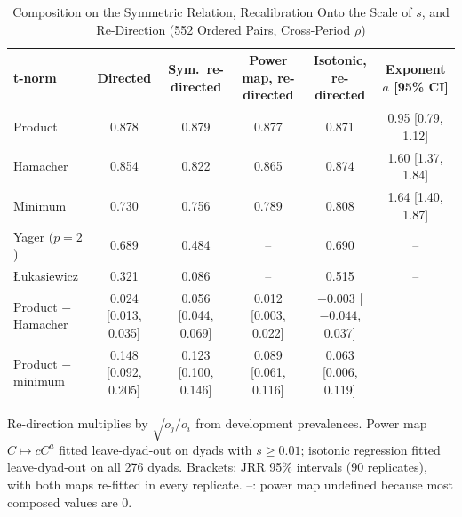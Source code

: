 \documentclass[journal]{IEEEtran}
\begin{document}
\setcounter{table}{16}\begin{table}[!t]
\caption{Composition on the Symmetric Relation, Recalibration Onto the Scale of $s$, and Re-Direction (552 Ordered Pairs, Cross-Period $\rho$)}
\centering
\scriptsize
\setlength{\tabcolsep}{3pt}
\begin{tabular}{@{}l c c c c c@{}}
\toprule
t-norm & Directed & Sym.\ re-directed & Power map, re-directed & Isotonic, re-directed & Exponent $a$ [95\% CI]\\
\midrule
Product & 0.878 & 0.879 & 0.877 & 0.871 & 0.95 [0.79, 1.12]\\
Hamacher & 0.854 & 0.822 & 0.865 & 0.874 & 1.60 [1.37, 1.84]\\
Minimum & 0.730 & 0.756 & 0.789 & 0.808 & 1.64 [1.40, 1.87]\\
Yager ($p=2$) & 0.689 & 0.484 & -- & 0.690 & --\\
{\L}ukasiewicz & 0.321 & 0.086 & -- & 0.515 & --\\
\midrule
Product $-$ Hamacher & 0.024 [0.013, 0.035] & 0.056 [0.044, 0.069] & 0.012 [0.003, 0.022] & $-0.003$ [$-0.044$, 0.037] & \\
Product $-$ minimum & 0.148 [0.092, 0.205] & 0.123 [0.100, 0.146] & 0.089 [0.061, 0.116] & 0.063 [0.006, 0.119] & \\
\bottomrule
\end{tabular}

\smallskip
\parbox{\textwidth}{\scriptsize Re-direction multiplies by $\sqrt{o_j/o_i}$ from development prevalences. Power map $C\mapsto cC^a$ fitted leave-dyad-out on dyads with $s\ge0.01$; isotonic regression fitted leave-dyad-out on all 276 dyads. Brackets: JRR 95\% intervals (90 replicates), with both maps re-fitted in every replicate. --: power map undefined because most composed values are 0.}
\end{table}
\end{document}
